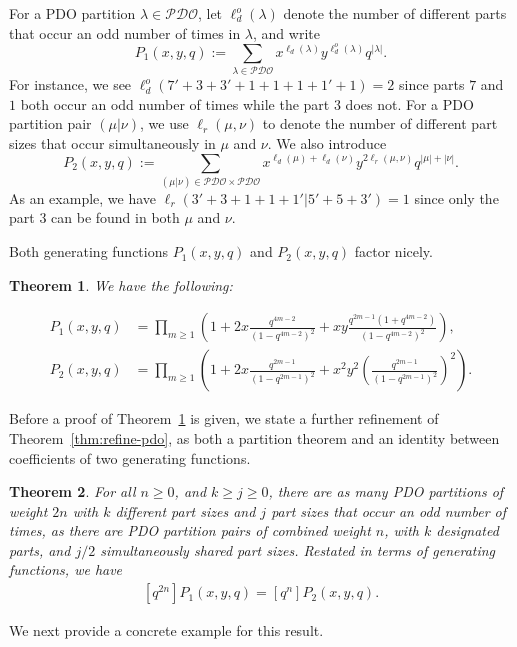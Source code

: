 \documentclass[11pt,reqno]{amsart}
\numberwithin{equation}{section}
\theoremstyle{plain}
\newtheorem{theorem}{Theorem}[section]
\theoremstyle{definition}
\theoremstyle{named}
\def\PDOset{\mathcal{PDO}}
\def\ld{\ell_d}
\def\ldo{\ell_d^o}
\def\lr{\ell_r}
\begin{document}
For a PDO partition $\lambda\in\PDOset$, let $\ldo(\lambda)$ denote  the number of different parts that occur an odd number of times in $\lambda$, and write 
$$P_1(x,y,q):=\sum_{\lambda\in\PDOset}x^{\ld(\lambda)}y^{\ldo(\lambda)}q^{|\lambda|}.$$ 
For instance, we see $\ldo(7'+3+3'+1+1+1+1'+1)=2$ since parts $7$ and $1$ both occur an odd number of times while the part $3$ does not. For a PDO partition pair $(\mu | \nu)$, we use $\lr(\mu,\nu)$ to denote the number of different part sizes that occur simultaneously  in  $\mu$ and $\nu$. We also introduce $$P_2(x,y,q):=\sum_{(\mu | \nu)\in\PDOset\times\PDOset}x^{\ld(\mu)+\ld(\nu)}y^{2\lr(\mu,\nu)}q^{|\mu|+|\nu|}.$$ 
As an example, we have $\lr(3'+3+1+1+1'| 5'+5+3')=1$ since only the part $3$ can be found in both $\mu$ and $\nu$. 

Both generating functions $P_1(x,y,q)$ and $P_2(x,y,q)$ factor nicely.

\begin{theorem}\label{thm:expression-P1-P2}
We have the following: 

\begin{align}
\label{eq:P1}
P_1(x,y,q) &=\prod_{m\ge 1}\left(1+2x\frac{q^{4m-2}}{(1-q^{4m-2})^2}+xy\frac{q^{2m-1}(1+q^{4m-2})}{(1-q^{4m-2})^2}\right),\\
P_2(x,y,q) &=\prod_{m\ge 1}\left(1+2x\frac{q^{2m-1}}{(1-q^{2m-1})^2}+x^2y^2\left(\frac{q^{2m-1}}{(1-q^{2m-1})^2}\right)^2\right).
\label{eq:P2}
\end{align}
\end{theorem}

Before a proof of Theorem~\ref{thm:expression-P1-P2} is given, we state a further refinement of Theorem~\ref{thm:refine-pdo}, as both a partition theorem and an identity between coefficients of two generating functions.
\begin{theorem}\label{thm:xy-refine}
For all $n\ge 0$, and $k\ge j\ge 0$, there are as many PDO partitions of weight $2n$ with $k$ different part sizes and $j$ part sizes that occur an odd number of times, as there are PDO partition pairs of combined weight $n$, with $k$ designated parts, and $j/2$ simultaneously shared part sizes. Restated in terms of generating functions, we have
\begin{align}\label{id:P1=P2}
[q^{2n}]P_1(x,y,q) = [q^n]P_2(x,y,q).
\end{align}
\end{theorem}

We next provide a concrete example for this result.
\end{document}
